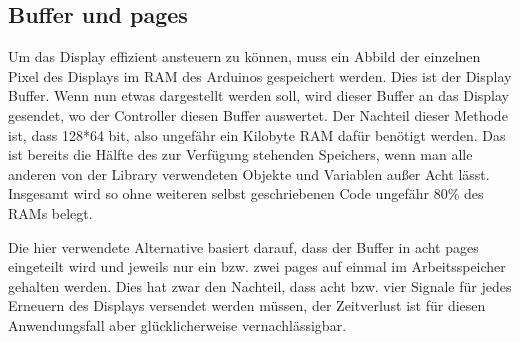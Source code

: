 \documentclass[letterpaper,10pt,ngerman]{sphinxmanual}
\begin{document}
\subsection{Buffer und pages}
\label{\detokenize{programming:buffer-und-pages}}
Um das Display effizient ansteuern zu können, muss
ein Abbild der einzelnen Pixel des Displays im RAM des Arduinos gespeichert
werden. Dies ist der Display Buffer. Wenn nun etwas dargestellt werden soll,
wird dieser Buffer an das Display gesendet, wo der Controller diesen Buffer
auswertet. Der Nachteil dieser Methode ist, dass 128*64 bit, also ungefähr ein
Kilobyte RAM dafür benötigt werden. Das ist bereits die Hälfte des zur
Verfügung stehenden Speichers, wenn man alle anderen von der Library
verwendeten Objekte und Variablen außer Acht lässt. Insgesamt wird so ohne
weiteren selbst geschriebenen Code ungefähr 80\% des RAMs belegt.

Die hier verwendete Alternative basiert darauf, dass der Buffer in acht pages
eingeteilt wird und jeweils nur ein bzw. zwei pages auf einmal im
Arbeitsspeicher gehalten werden. Dies hat zwar den Nachteil, dass acht bzw.
vier Signale für jedes Erneuern des Displays versendet werden müssen, der
Zeitverlust ist für diesen Anwendungsfall aber glücklicherweise
vernachlässigbar.
\end{document}
